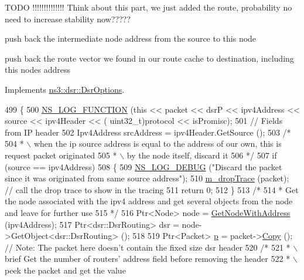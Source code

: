 T\+O\+DO !!!!!!!!!!!!!! Think about this part, we just added the route, probability no need to increase stability now?????

push back the intermediate node address from the source to this node

push back the route vector we found in our route cache to destination, including this node\textquotesingle{}s address

Implements \hyperlink{classns3_1_1dsr_1_1DsrOptions_ac34fb87a95464f3ea9d82ad12253a5cc}{ns3\+::dsr\+::\+Dsr\+Options}.


\begin{DoxyCode}
499 \{
500   \hyperlink{log-macros-disabled_8h_a90b90d5bad1f39cb1b64923ea94c0761}{NS\_LOG\_FUNCTION} (\textcolor{keyword}{this} << packet << dsrP << ipv4Address << source << ipv4Header << (
      uint32\_t)protocol << isPromisc);
501   \textcolor{comment}{// Fields from IP header}
502   Ipv4Address srcAddress = ipv4Header.GetSource ();
503   \textcolor{comment}{/*}
504 \textcolor{comment}{   * \(\backslash\) when the ip source address is equal to the address of our own, this is request packet originated}
505 \textcolor{comment}{   * \(\backslash\) by the node itself, discard it}
506 \textcolor{comment}{   */}
507   \textcolor{keywordflow}{if} (source == ipv4Address)
508     \{
509       \hyperlink{group__logging_ga413f1886406d49f59a6a0a89b77b4d0a}{NS\_LOG\_DEBUG} (\textcolor{stringliteral}{"Discard the packet since it was originated from same source address"});
510       \hyperlink{classns3_1_1dsr_1_1DsrOptions_a176bbc9efb58b6d750c14b9b03c525c4}{m\_dropTrace} (packet); \textcolor{comment}{// call the drop trace to show in the tracing}
511       \textcolor{keywordflow}{return} 0;
512     \}
513   \textcolor{comment}{/*}
514 \textcolor{comment}{   * Get the node associated with the ipv4 address and get several objects from the node and leave for
       further use}
515 \textcolor{comment}{   */}
516   Ptr<Node> node = \hyperlink{classns3_1_1dsr_1_1DsrOptions_a1a91f820f3d754a477a54bad547ca659}{GetNodeWithAddress} (ipv4Address);
517   Ptr<dsr::DsrRouting> dsr = node->GetObject<dsr::DsrRouting> ();
518 
519   Ptr<Packet> \hyperlink{lte__link__budget_8m_ac9de518908a968428863f829398a4e62}{p} = packet->\hyperlink{classns3_1_1Packet_a5d5c70802a5f77fc5f0001e0cfc1898b}{Copy} (); \textcolor{comment}{// Note: The packet here doesn't contain the fixed size dsr header}
520   \textcolor{comment}{/*}
521 \textcolor{comment}{   * \(\backslash\)brief Get the number of routers' address field before removing the header}
522 \textcolor{comment}{   * \(\backslash\)peek the packet and get the value}

\end{DoxyCode}
